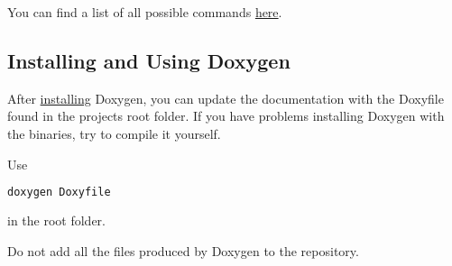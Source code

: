 You can find a list of all possible commands \href{http://www.stack.nl/~dimitri/doxygen/manual/commands.html}{here}.

\subsection{Installing and Using Doxygen}
\label{subsec:Doxygen}

After \href{http://www.stack.nl/~dimitri/doxygen/download.html}{installing} Doxygen, you can update the documentation with the Doxyfile found in the projects root folder. If you have problems installing Doxygen with the binaries, try to compile it yourself. 

Use
\begin{lstlisting}[language=bash, numbers=none]
	doxygen Doxyfile
\end{lstlisting}
in the root folder.

\begin{mdframed}
Do not add all the files produced by Doxygen to the repository.
\end{mdframed}